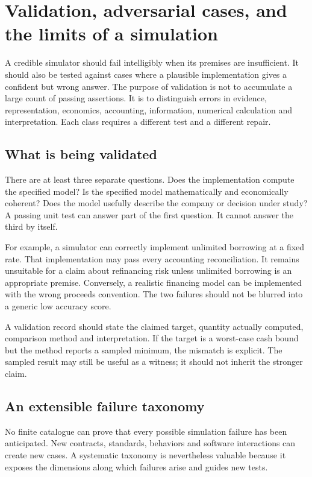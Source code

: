 \chapter[Validation and failure analysis]{Validation, adversarial cases, and the limits of a simulation}
\label{sim:validation}

A credible simulator should fail intelligibly when its premises are insufficient. It should also be tested against cases where a plausible implementation gives a confident but wrong answer. The purpose of validation is not to accumulate a large count of passing assertions. It is to distinguish errors in evidence, representation, economics, accounting, information, numerical calculation and interpretation. Each class requires a different test and a different repair.

\section{What is being validated}
There are at least three separate questions. Does the implementation compute the specified model? Is the specified model mathematically and economically coherent? Does the model usefully describe the company or decision under study? A passing unit test can answer part of the first question. It cannot answer the third by itself.

For example, a simulator can correctly implement unlimited borrowing at a fixed rate. That implementation may pass every accounting reconciliation. It remains unsuitable for a claim about refinancing risk unless unlimited borrowing is an appropriate premise. Conversely, a realistic financing model can be implemented with the wrong proceeds convention. The two failures should not be blurred into a generic low accuracy score.

A validation record should state the claimed target, quantity actually computed, comparison method and interpretation. If the target is a worst-case cash bound but the method reports a sampled minimum, the mismatch is explicit. The sampled result may still be useful as a witness; it should not inherit the stronger claim.

\section{An extensible failure taxonomy}
No finite catalogue can prove that every possible simulation failure has been anticipated. New contracts, standards, behaviors and software interactions can create new cases. A systematic taxonomy is nevertheless valuable because it exposes the dimensions along which failures arise and guides new tests.


